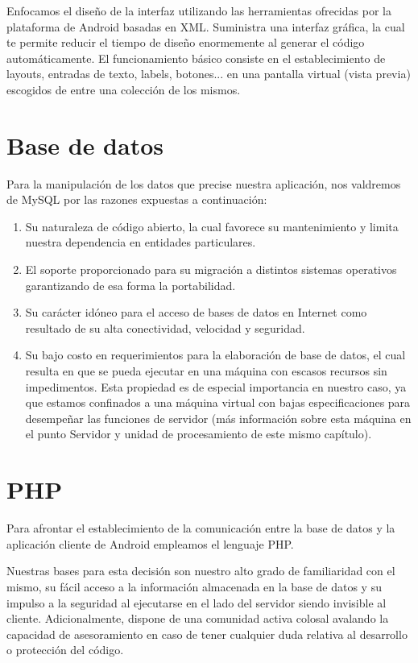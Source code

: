 \documentclass[11pt,spanish,
		listoftables,listoffigures]
		{tfgplantilla}
\begin{document}
Enfocamos el diseño de la interfaz utilizando las herramientas ofrecidas por la plataforma de Android basadas en XML. Suministra una interfaz gráfica, la cual te permite reducir el tiempo de diseño enormemente al generar el código automáticamente. El funcionamiento básico consiste en el establecimiento de layouts, entradas de texto, labels, botones... en una pantalla virtual (vista previa) escogidos de entre una colección de los mismos. 

\section {Base de datos}

Para la manipulación de los datos que precise nuestra aplicación, nos valdremos de MySQL por las razones expuestas a continuación:

\begin{enumerate}
	\item Su naturaleza de código abierto, la cual favorece su mantenimiento y limita nuestra dependencia en entidades particulares.

	\item El soporte proporcionado para su migración a distintos sistemas operativos garantizando de esa forma la portabilidad.

	\item Su carácter idóneo para el acceso de bases de datos en Internet como resultado de su alta conectividad, velocidad y seguridad.

	\item Su bajo costo en requerimientos para la elaboración de base de datos, el cual resulta en que se pueda ejecutar en una máquina con escasos recursos sin impedimentos. Esta propiedad es de especial importancia en nuestro caso, ya que estamos confinados a una máquina virtual con bajas especificaciones para  desempeñar las funciones de servidor (más información sobre esta máquina en el punto Servidor y unidad de procesamiento de este mismo capítulo).
\end{enumerate}

\section {PHP}

Para afrontar el establecimiento de la comunicación entre la base de datos y la aplicación cliente de Android empleamos el lenguaje PHP.

Nuestras bases para esta decisión son nuestro alto grado de familiaridad con el mismo, su fácil acceso a la información almacenada en la base de datos y su impulso a la seguridad al ejecutarse en el lado del servidor siendo invisible al cliente. Adicionalmente, dispone de una comunidad activa colosal avalando la capacidad de asesoramiento en caso de tener cualquier duda relativa al desarrollo o protección del código.
\end{document}
